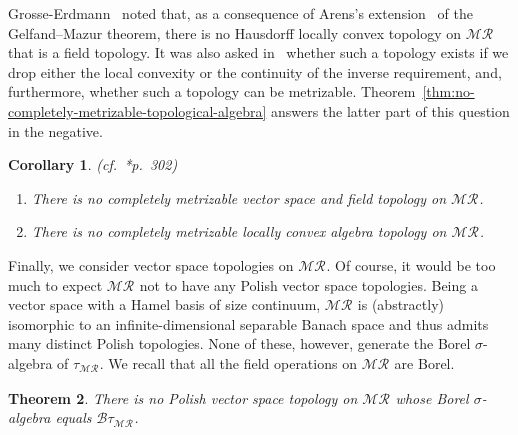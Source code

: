 \documentclass[12pt]{paper}
\numberwithin{equation}{section}
\theoremstyle{plain}
\newtheorem{theorem}{Theorem}[section]
\newtheorem{corollary}[theorem]{Corollary}
\theoremstyle{definition}
\newcommand{\borel}{\mathcal{B}}
\newcommand{\merom}[1][]{\mathcal{MR}_{#1}}
\begin{document}
Grosse-Erdmann~\cite{grosse-erdmannLocallyConvexTopology1995} noted that, as a consequence of
Arens's extension~\cite{arensLinearTopologicalDivision1947} of the Gelfand--Mazur theorem, there is
no Hausdorff locally convex topology on \(\merom\) that is a field topology.  It was also asked
in~\cite{grosse-erdmannLocallyConvexTopology1995} whether such a topology exists if we drop either
the local convexity or the continuity of the inverse requirement, and, furthermore, whether such a
topology can be metrizable.  Theorem~\ref{thm:no-completely-metrizable-topological-algebra} answers
the latter part of this question in the negative.

\begin{corollary}{\rm (cf.~\cite{grosse-erdmannLocallyConvexTopology1995}*{p.~302})\phantom{}}
  \begin{enumerate}[leftmargin=.6cm, label={\sf \arabic*}., ref={\sf \arabic*}]
  \item There is no completely metrizable vector space and field topology on \(\merom\).
  \item There is no completely metrizable locally convex algebra topology on \(\merom\).
  \end{enumerate}
\end{corollary}

Finally, we consider vector space topologies on \(\merom\).  Of course, it would be too much to
expect \(\merom\) not to have any Polish vector space topologies.  Being a vector space with a Hamel
basis of size continuum, \(\merom\) is (abstractly) isomorphic to an infinite-dimensional separable
Banach space and thus admits many distinct Polish topologies.  None of these, however, generate the
Borel \(\sigma\)-algebra of \(\tau_{\merom}\).  We recall that all the field operations on
\(\merom\) are Borel.

\begin{theorem}
  \label{thm:no-vector-space-topology-same-borel}
  There is no Polish vector space topology on \(\merom\) whose Borel \(\sigma\)-algebra equals
  \(\borel{\tau_{\merom}}\).
\end{theorem}
\end{document}
